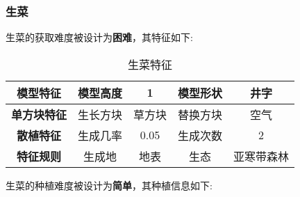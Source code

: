 \subsubsection{生菜}

生菜的获取难度被设计为\textbf{困难}，其特征如下:
\begin{table}[H]
    \centering
    \caption{生菜特征}
    \label{table:生菜特征}
    \setlength{\tabcolsep}{4mm}
    \begin{tabular}{c|cc|cc}
        \toprule
        \textbf{模型特征}   & 模型高度 & 1      & 模型形状 & 井字     \\
        \midrule
        \textbf{单方块特征} & 生长方块 & 草方块 & 替换方块 & 空气     \\
        \midrule
        \textbf{散植特征}   & 生成几率 & 0.05   & 生成次数 & 2        \\
        \midrule
        \textbf{特征规则}   & 生成地   & 地表   & 生态     & 亚寒带森林 \\
        \bottomrule
    \end{tabular}
\end{table}


生菜的种植难度被设计为\textbf{简单}，其种植信息如下:

